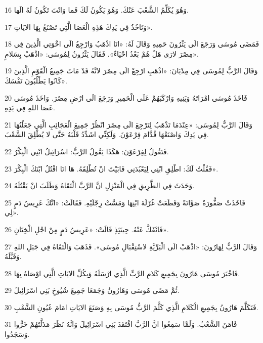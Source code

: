 \par 16 وَهُوَ يُكَلِّمُ الشَّعْبَ عَنْكَ. وَهُوَ يَكُونُ لَكَ فَما وَانْتَ تَكُونُ لَهُ الَها.
\par 17 وَتَاخُذُ فِي يَدِكَ هَذِهِ الْعَصَا الَّتِي تَصْنَعُ بِهَا الايَاتِ».
\par 18 فَمَضَى مُوسَى وَرَجَعَ الَى يَثْرُونَ حَمِيهِ وَقَالَ لَهُ: «انَا اذْهَبُ وَارْجِعُ الَى اخْوَتِي الَّذِينَ فِي مِصْرَ لارَى هَلْ هُمْ بَعْدُ احْيَاءٌ». فَقَالَ يَثْرُونُ لِمُوسَى: «اذْهَبْ بِسَلامٍ».
\par 19 وَقَالَ الرَّبُّ لِمُوسَى فِي مِدْيَانَ: «اذْهَبِ ارْجِعْ الَى مِصْرَ لانَّهُ قَدْ مَاتَ جَمِيعُ الْقَوْمِ الَّذِينَ كَانُوا يَطْلُبُونَ نَفْسَكَ».
\par 20 فَاخَذَ مُوسَى امْرَاتَهُ وَبَنِيهِ وَارْكَبَهُمْ عَلَى الْحَمِيرِ وَرَجَعَ الَى ارْضِ مِصْرَ. وَاخَذَ مُوسَى عَصَا اللهِ فِي يَدِهِ.
\par 21 وَقَالَ الرَّبُّ لِمُوسَى: «عِنْدَمَا تَذْهَبُ لِتَرْجِعَ الَى مِصْرَ انْظُرْ جَمِيعَ الْعَجَائِبِ الَّتِي جَعَلْتُهَا فِي يَدِكَ وَاصْنَعْهَا قُدَّامَ فِرْعَوْنَ. وَلَكِنِّي اشَدِّدُ قَلْبَهُ حَتَّى لا يُطْلِقَ الشَّعْبَ.
\par 22 فَتَقُولُ لِفِرْعَوْنَ: هَكَذَا يَقُولُ الرَّبُّ: اسْرَائِيلُ ابْنِي الْبِكْرُ.
\par 23 فَقُلْتُ لَكَ: اطْلِقِ ابْنِي لِيَعْبُدَنِي فَابَيْتَ انْ تُطْلِقَهُ. هَا انَا اقْتُلُ ابْنَكَ الْبِكْرَ».
\par 24 وَحَدَثَ فِي الطَّرِيقِ فِي الْمَنْزِلِ انَّ الرَّبَّ الْتَقَاهُ وَطَلَبَ انْ يَقْتُلَهُ.
\par 25 فَاخَذَتْ صَفُّورَةُ صَوَّانَةً وَقَطَعَتْ غُرْلَةَ ابْنِهَا وَمَسَّتْ رِجْلَيْهِ. فَقَالَتْ: «انَّكَ عَرِيسُ دَمٍ لِي».
\par 26 فَانْفَكَّ عَنْهُ. حِينَئِذٍ قَالَتْ: «عَرِيسُ دَمٍ مِنْ اجْلِ الْخِتَانِ».
\par 27 وَقَالَ الرَّبُّ لِهَارُونَ: «اذْهَبْ الَى الْبَرِّيَّةِ لاسْتِقْبَالِ مُوسَى». فَذَهَبَ وَالْتَقَاهُ فِي جَبَلِ اللهِ وَقَبَّلَهُ.
\par 28 فَاخْبَرَ مُوسَى هَارُونَ بِجَمِيعِ كَلامِ الرَّبِّ الَّذِي ارْسَلَهُ وَبِكُلِّ الايَاتِ الَّتِي اوْصَاهُ بِهَا.
\par 29 ثُمَّ مَضَى مُوسَى وَهَارُونُ وَجَمَعَا جَمِيعَ شُيُوخِ بَنِي اسْرَائِيلَ.
\par 30 فَتَكَلَّمَ هَارُونُ بِجَمِيعِ الْكَلامِ الَّذِي كَلَّمَ الرَّبُّ مُوسَى بِهِ وَصَنَعَ الايَاتِ امَامَ عُيُونِ الشَّعْبِ.
\par 31 فَامَنَ الشَّعْبُ. وَلَمَّا سَمِعُوا انَّ الرَّبَّ افْتَقَدَ بَنِي اسْرَائِيلَ وَانَّهُ نَظَرَ مَذَلَّتَهُمْ خَرُّوا وَسَجَدُوا.

